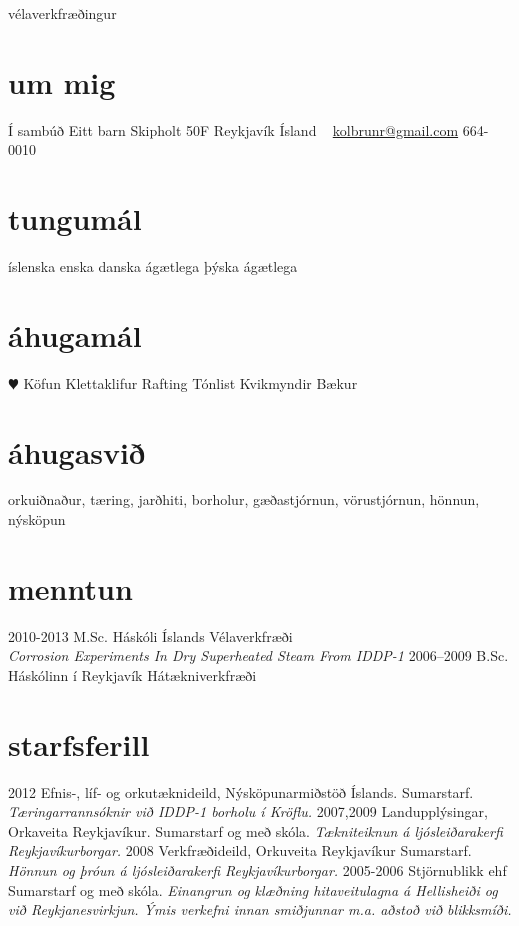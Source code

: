 \documentclass[]{friggeri-cv}
\begin{document}
       {vélaverkfræðingur}


\begin{aside}
  \section{um mig}
    Í sambúð
    Eitt barn
    Skipholt 50F
    Reykjavík
    Ísland
    ~
    \href{mailto:kolbrunr@gmail.com}{kolbrunr@gmail.com}
    664-0010
  \section{tungumál}
    íslenska
    enska
    danska ágætlega
    þýska ágætlega
  \section{áhugamál}
    {\color{red} $\varheartsuit$} Köfun
    Klettaklifur
    Rafting
    Tónlist
    Kvikmyndir
    Bækur
\end{aside}

\section{áhugasvið}

orkuiðnaður, tæring, jarðhiti, borholur, gæðastjórnun, vörustjórnun, hönnun, nýsköpun

\section{menntun}

\begin{entrylist}
  \entry
    {2010-2013}
    {M.Sc.} %
    {Háskóli Íslands}
    {Vélaverkfræði\\
    \emph{Corrosion Experiments In Dry Superheated Steam From IDDP-1}}
  \entry
    {2006–2009}
    {B.Sc.} %
    {Háskólinn í Reykjavík}
    {Hátækniverkfræði}
\end{entrylist}

\section{starfsferill}

\begin{entrylist}
  \entry
    {2012}
    {Efnis-, líf- og orkutæknideild, Nýsköpunarmiðstöð Íslands.}
    {Sumarstarf.}
    {\emph{Tæringarrannsóknir við IDDP-1 borholu í Kröflu.}}
  \entry
    {2007,2009}
    {Landupplýsingar, Orkaveita Reykjavíkur.}
    {Sumarstarf og með skóla.}
    {\emph{Tækniteiknun á ljósleiðarakerfi Reykjavíkurborgar.}}
  \entry
    {2008}
    {Verkfræðideild, Orkuveita Reykjavíkur}
    {Sumarstarf.}
    {\emph{Hönnun og þróun á ljósleiðarakerfi Reykjavíkurborgar.}}
  \entry
    {2005-2006}
    {Stjörnublikk ehf}
    {Sumarstarf og með skóla.}
    {\emph{Einangrun og klæðning hitaveitulagna á Hellisheiði og við Reykjanesvirkjun. Ýmis verkefni innan smiðjunnar m.a. aðstoð við blikksmíði.}}
\end{entrylist}
\end{document}
